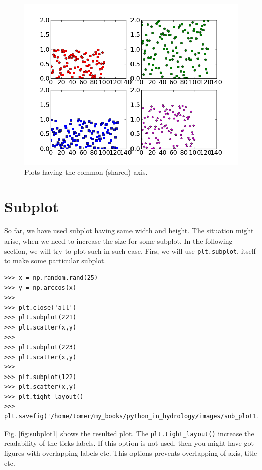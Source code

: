 \documentclass[10pt]{book}
\begin{document}
{\beforefig
\begin{figure}[h!]
  \centering
    \includegraphics[scale=0.5]{images/shared_xy.png}
  \caption{Plots having the common (shared) axis.}
   \label{fig:shared_xy}
\end{figure}
\afterfig

\section{Subplot}
So far, we have used subplot having same width and height. The situation might arise, when we need to increase the size for some subplot. In the following section, we will try to plot such in such case. Firs, we will use \verb"plt.subplot", itself to make some particular subplot. 

\beforeverb \begin{verbatim}
>>> x = np.random.rand(25)
>>> y = np.arccos(x)
>>> 
>>> plt.close('all')
>>> plt.subplot(221)
>>> plt.scatter(x,y)
>>> 
>>> plt.subplot(223)
>>> plt.scatter(x,y)
>>> 
>>> plt.subplot(122)
>>> plt.scatter(x,y)
>>> plt.tight_layout()
>>> plt.savefig('/home/tomer/my_books/python_in_hydrology/images/sub_plot1.png')
\end{verbatim} \afterverb
Fig. \ref{fig:subplot1} shows the resulted plot. The \verb"plt.tight_layout()" increase the readability of the ticks labels. If this option is not used, then you might have got figures with overlapping labels etc. This options prevents overlapping of axis, title etc.

}
\end{document}
